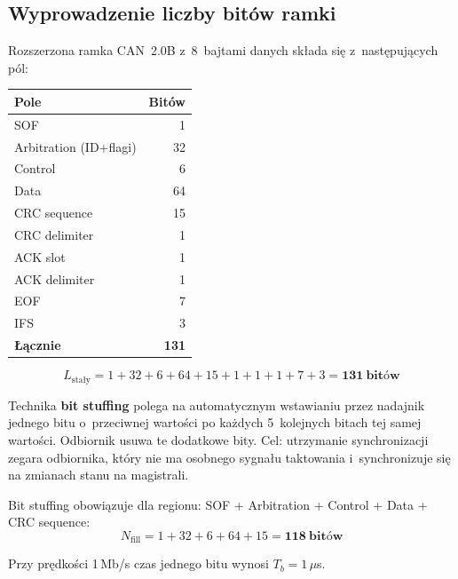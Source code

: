 \documentclass[12pt,a4paper]{article}
\begin{document}
\subsection*{Wyprowadzenie liczby bitów ramki}

Rozszerzona ramka CAN~2.0B z~8~bajtami danych składa się z~następujących pól:

\begin{table}[H]
\centering
\small
\begin{tabular}{lr}
\toprule
\textbf{Pole} & \textbf{Bitów} \\
\midrule
SOF                    &  1 \\
Arbitration (ID+flagi) & 32 \\
Control                &  6 \\
Data                   & 64 \\
CRC sequence           & 15 \\
CRC delimiter          &  1 \\
ACK slot               &  1 \\
ACK delimiter          &  1 \\
EOF                    &  7 \\
IFS                    &  3 \\
\midrule
\textbf{Łącznie}       & \textbf{131} \\
\bottomrule
\end{tabular}
\end{table}

\begin{equation*}
L_{\text{stały}} = 1 + 32 + 6 + 64 + 15 + 1 + 1 + 1 + 7 + 3 = \mathbf{131\ \text{bitów}}
\end{equation*}

Technika \textbf{bit stuffing} polega na automatycznym wstawianiu przez nadajnik
jednego bitu o~przeciwnej wartości po każdych 5~kolejnych bitach tej samej wartości.
Odbiornik usuwa te dodatkowe bity. Cel: utrzymanie synchronizacji zegara odbiornika,
który nie ma osobnego sygnału taktowania i~synchronizuje się na zmianach stanu
na magistrali.

Bit stuffing obowiązuje dla regionu: SOF + Arbitration + Control + Data + CRC sequence:
\begin{equation*}
N_{\text{fill}} = 1 + 32 + 6 + 64 + 15 = \mathbf{118\ \text{bitów}}
\end{equation*}

Przy prędkości 1\,Mb/s czas jednego bitu wynosi $T_b = 1\,\mu$s.
\end{document}
